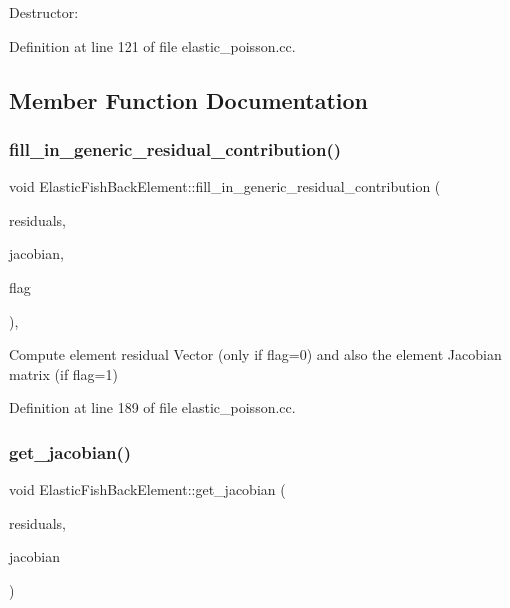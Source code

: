 Destructor\+: 



Definition at line 121 of file elastic\+\_\+poisson.\+cc.



\subsection{Member Function Documentation}
\mbox{\label{classElasticFishBackElement_a03865180362294a36322523ff2a880ad}} 
\subsubsection{\texorpdfstring{fill\+\_\+in\+\_\+generic\+\_\+residual\+\_\+contribution()}{fill\_in\_generic\_residual\_contribution()}}
{\footnotesize\ttfamily void Elastic\+Fish\+Back\+Element\+::fill\+\_\+in\+\_\+generic\+\_\+residual\+\_\+contribution (\begin{DoxyParamCaption}\item[{Vector$<$ double $>$ \&}]{residuals,  }\item[{Dense\+Matrix$<$ double $>$ \&}]{jacobian,  }\item[{unsigned}]{flag }\end{DoxyParamCaption})\hspace{0.3cm}{\ttfamily [inline]}, {\ttfamily [protected]}}



Compute element residual Vector (only if flag=0) and also the element Jacobian matrix (if flag=1) 



Definition at line 189 of file elastic\+\_\+poisson.\+cc.

\mbox{\label{classElasticFishBackElement_a48729984910b86d7210ed218bcb821bd}} 
\subsubsection{\texorpdfstring{get\+\_\+jacobian()}{get\_jacobian()}}
{\footnotesize\ttfamily void Elastic\+Fish\+Back\+Element\+::get\+\_\+jacobian (\begin{DoxyParamCaption}\item[{Vector$<$ double $>$ \&}]{residuals,  }\item[{Dense\+Matrix$<$ double $>$ \&}]{jacobian }\end{DoxyParamCaption})\hspace{0.3cm}{\ttfamily [inline]}}



